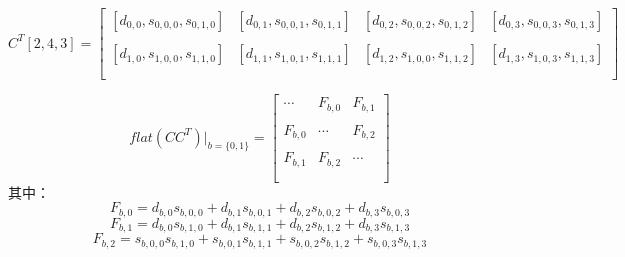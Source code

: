 \documentclass{article}
\begin{document}
$$
C^T [2,4,3]=
\begin{bmatrix}
    [d_{0,0},s_{0,0,0},s_{0,1,0}] & [d_{0,1},s_{0,0,1},s_{0,1,1}] & [d_{0,2},s_{0,0,2},s_{0,1,2}] & [d_{0,3},s_{0,0,3},s_{0,1,3}]\\\\
    [d_{1,0},s_{1,0,0},s_{1,1,0}] & [d_{1,1},s_{1,0,1},s_{1,1,1}] & [d_{1,2},s_{1,0,0},s_{1,1,2}] & [d_{1,3},s_{1,0,3},s_{1,1,3}]\\\\
\end{bmatrix}
$$

$$
flat(CC^T)|_{b=\{0,1\}}=
\begin{bmatrix}
      \cdots   &   F_{b,0}     & F_{b,1}  \\\\
      F_{b,0}  &   \cdots      & F_{b,2}  \\\\ 
      F_{b,1}  &   F_{b,2}     & \cdots   \\\\
\end{bmatrix}
$$
其中：
$$
F_{b,0}=d_{b,0}s_{b,0,0}+d_{b,1}s_{b,0,1}+d_{b,2}s_{b,0,2}+d_{b,3}s_{b,0,3}
$$
$$
F_{b,1}=d_{b,0}s_{b,1,0}+d_{b,1}s_{b,1,1}+d_{b,2}s_{b,1,2}+d_{b,3}s_{b,1,3}
$$
$$
F_{b,2}=s_{b,0,0}s_{b,1,0}+s_{b,0,1}s_{b,1,1}+s_{b,0,2}s_{b,1,2}+s_{b,0,3}s_{b,1,3}
$$
\end{document}
